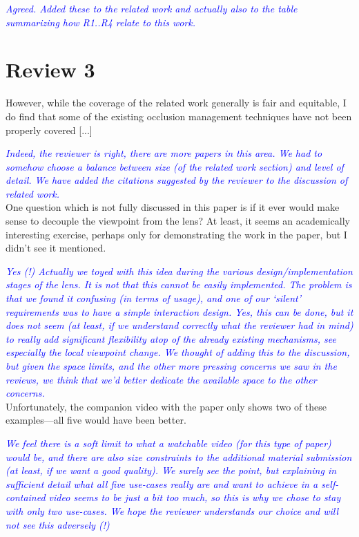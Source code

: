 \documentclass[a4paper,10pt]{article}
\newcommand{\rr}[1]{\emph{\textcolor{blue}{#1}}}
\begin{document}
    \rr{Agreed. Added these to the related work and actually also to the table summarizing how R1..R4 relate to this work.}\\    
    

\section{Review 3}

    However, while the coverage of the related work generally is fair and equitable, I
    do find that some of the existing occlusion management techniques have not been
    properly covered [...]
 
    \rr{Indeed, the reviewer is right, there are more papers in this area. We had to somehow choose a balance between size (of the related work section) and level of detail. We have added the citations suggested by the reviewer to the discussion of related work.}\\
    
    One question
    which is not fully discussed in this paper is if it ever would make sense to
    decouple the viewpoint from the lens? At least, it seems an academically
    interesting exercise, perhaps only for demonstrating the work in the paper, but I
    didn't see it mentioned.
    
    \rr{Yes (!) Actually we toyed with this idea during the various design/implementation stages of the lens. It is not that this cannot be easily implemented. The problem is that we found it confusing (in terms of usage), and one of our `silent' requirements was to have a simple interaction design. Yes, this can be done, but it does not seem (at least, if we understand correctly what the reviewer had in mind) to really add significant flexibility atop of the already existing mechanisms, see especially the local viewpoint change. We thought of adding this to the discussion, but given the space limits, and the other more pressing concerns we saw in the reviews, we think that we'd better dedicate the available space to the other concerns.}\\
    
    Unfortunately, the companion video with the paper
    only shows two of these examples---all five would have been better.
    
    \rr{We feel there is a soft limit to what a watchable video (for this type of paper) would be, and there are also size constraints to the additional material submission (at least, if we want a good quality). We surely see the point, but explaining in sufficient detail what all five use-cases really are and want to achieve in a self-contained video seems to be just a bit too much, so this is why we chose to stay with only two use-cases. We hope the reviewer understands our choice and will not see this adversely (!)}\\
    
\end{document}
